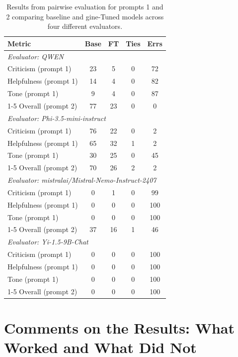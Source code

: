 \documentclass[12pt]{article}
\begin{document}
 \begin{table}[htbp]
\centering
\begin{tabular}{lcccc}
\toprule
\textbf{Metric} & \textbf{Base} & \textbf{FT} & \textbf{Ties} & \textbf{Errs} \\
\midrule
\multicolumn{5}{l}{\textit{Evaluator: QWEN}} \\
\midrule
Criticism (prompt 1)   & 23 & 5  & 0 & 72 \\
Helpfulness (prompt 1) & 14 & 4  & 0 & 82 \\
Tone (prompt 1)        & 9  & 4  & 0 & 87 \\
\cmidrule(lr){1-5}
Overall (prompt 2)     & 77 & 23 & 0 & 0  \\
\midrule
\multicolumn{5}{l}{\textit{Evaluator: Phi-3.5-mini-instruct}} \\
\midrule
Criticism (prompt 1)   & 76 & 22 & 0 & 2  \\
Helpfulness (prompt 1) & 65 & 32 & 1 & 2  \\
Tone (prompt 1)        & 30 & 25 & 0 & 45 \\
\cmidrule(lr){1-5}
Overall (prompt 2)     & 70 & 26 & 2 & 2  \\
\midrule
\multicolumn{5}{l}{\textit{Evaluator: mistralai/Mistral-Nemo-Instruct-2407}} \\
\midrule
Criticism (prompt 1)   & 0  & 1  & 0 & 99 \\
Helpfulness (prompt 1) & 0  & 0  & 0 & 100\\
Tone (prompt 1)        & 0  & 0  & 0 & 100\\
\cmidrule(lr){1-5}
Overall (prompt 2)     & 37 & 16 & 1 & 46 \\
\midrule
\multicolumn{5}{l}{\textit{Evaluator: Yi-1.5-9B-Chat}} \\
\midrule
Criticism (prompt 1)   & 0  & 0  & 0 & 100\\
Helpfulness (prompt 1) & 0  & 0  & 0 & 100\\
Tone (prompt 1)        & 0  & 0  & 0 & 100\\
\cmidrule(lr){1-5}
Overall (prompt 2)     & 0  & 0  & 0 & 100\\
\bottomrule
\end{tabular}
\caption{Results from pairwise evaluation  for prompts 1 and 2 comparing baseline and gine-Tuned models across four different evaluators.}
\label{tab:merged_pairwise_all}
\end{table}

\section{Comments on the Results: What Worked and What Did Not}
\end{document}
